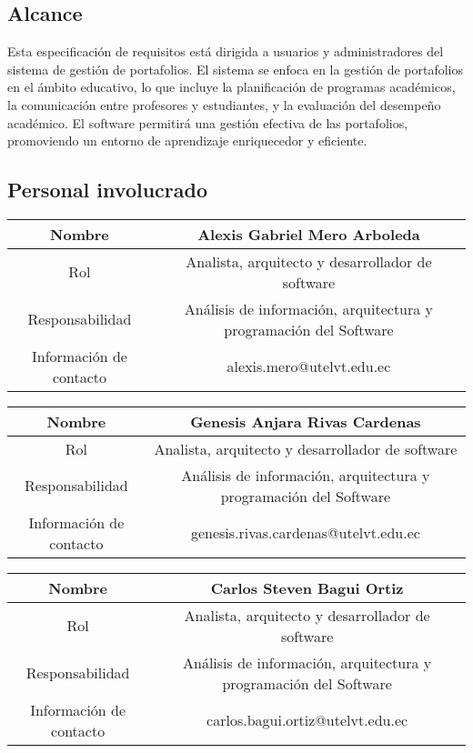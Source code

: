 \documentclass[11pt]{article}
\begin{document}
\subsection{\textbf{Alcance}}

Esta especificación de requisitos está dirigida a usuarios y 
administradores del sistema de gestión de portafolios. El sistema se 
enfoca en la gestión de portafolios en el ámbito educativo, lo que 
incluye la planificación de programas académicos, la comunicación 
entre profesores y estudiantes, y la evaluación del desempeño 
académico. El software permitirá una gestión efectiva de las 
portafolios, promoviendo un entorno de aprendizaje enriquecedor y 
eficiente.
\subsection{\textbf{Personal involucrado}}
\vspace{10pt}

\begin{tabular}{|c|c|}

\hline
Nombre & Alexis Gabriel Mero Arboleda  \\
\hline
Rol & Analista, arquitecto y desarrollador de software \\
\hline
Responsabilidad & Análisis de información, arquitectura y programación del Software  \\
\hline
Información de contacto & alexis.mero@utelvt.edu.ec \\
\hline

\end{tabular}

\vspace{10pt}

\begin{tabular}{|c|c|}

\hline
Nombre & Genesis Anjara Rivas Cardenas  \\
\hline
Rol & Analista, arquitecto y desarrollador de software \\
\hline
Responsabilidad & Análisis de información, arquitectura y programación del Software  \\
\hline
Información de contacto & genesis.rivas.cardenas@utelvt.edu.ec \\
\hline

\end{tabular}
\vspace{10pt}

\begin{tabular}{|c|c|}

\hline
Nombre & Carlos Steven Bagui Ortiz  \\
\hline
Rol & Analista, arquitecto y desarrollador de software \\
\hline
Responsabilidad & Análisis de información, arquitectura y programación del Software  \\
\hline
Información de contacto & carlos.bagui.ortiz@utelvt.edu.ec \\
\hline

\end{tabular}
\vspace{10pt}
\end{document}

